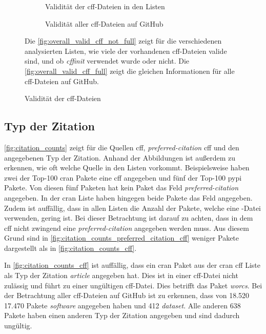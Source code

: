 \begin{figure}
    \begin{subfigure}{.5\textwidth}
        \centering
        
        \caption{Validität der \gls{cff}-Dateien in den Listen}
        \label{fig:overall_valid_cff_not_full}
    \end{subfigure}%
    \begin{subfigure}{.5\textwidth}
        \centering
        
        \caption{Validität aller \gls{cff}-Dateien auf GitHub}
        \label{fig:overall_valid_cff_full}
    \end{subfigure}
    \caption{Validität der \gls{cff}-Dateien}
    \label{fig:overall_valid_cff}
    \small
    Die \autoref{fig:overall_valid_cff_not_full} zeigt für die verschiedenen analysierten Listen, wie viele der vorhandenen \gls{cff}-Dateien valide sind, und ob \emph{cffinit} verwendet wurde oder nicht. Die \autoref{fig:overall_valid_cff_full} zeigt die gleichen Informationen für alle \gls{cff}-Dateien auf GitHub.
\end{figure}

\subsection*{Typ der Zitation}
\autoref{fig:citation_counts} zeigt für die Quellen \gls{cff}, \emph{preferred-citation} \gls{cff} und  den angegebenen Typ der Zitation.
Anhand der Abbildungen ist außerdem zu erkennen, wie oft welche Quelle in den Listen vorkommt.
Beispielsweise haben zwei der Top-100 \gls{cran} Pakete eine \gls{cff} angegeben und fünf der Top-100 \gls{pypi} Pakete.
Von diesen fünf Paketen hat kein Paket das Feld \emph{preferred-citation} angegeben.
In der \gls{cran} Liste haben hingegen beide Pakete das Feld angegeben.
Zudem ist auffällig, dass in allen Listen die Anzahl der Pakete, welche eine -Datei verwenden, gering ist.
Bei dieser Betrachtung ist darauf zu achten, dass in dem \gls{cff} nicht zwingend eine \emph{preferred-citation} angegeben werden muss.
Aus diesem Grund sind in \autoref{fig:citation_counts_preferred_citation_cff} weniger Pakete dargestellt als in \autoref{fig:citation_counts_cff}.

In \autoref{fig:citation_counts_cff} ist auffällig, dass ein \gls{cran} Paket aus der \gls{cran} \gls{cff} Liste als Typ der Zitation \emph{article} angegeben hat.
Dies ist in einer \gls{cff}-Datei nicht zulässig und führt zu einer ungültigen \gls{cff}-Datei.
Dies betrifft das Paket \emph{worcs}.
Bei der Betrachtung aller \gls{cff}-Dateien auf GitHub ist zu erkennen, dass von 18.520 17.470 Pakete \emph{software} angegeben haben und 412 \emph{dataset}.
Alle anderen 638 Pakete haben einen anderen Typ der Zitation angegeben und sind dadurch ungültig.

